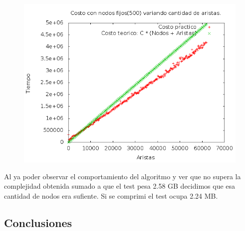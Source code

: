 \begin{itemize}
\begin{itemize}
\begin{figure}[H]
	\centering
	\includegraphics[scale=0.6]{ej3-grafico2.png}
\end{figure}

\quad Al ya poder observar el comportamiento del algoritmo y ver que no supera la complejidad obtenida sumado a que el test pesa 2.58 GB decidimos que esa cantidad de nodos era sufiente. Si se comprimi el test ocupa 2.24 MB.


\end{itemize}
\end{itemize}

\subsection{Conclusiones}


